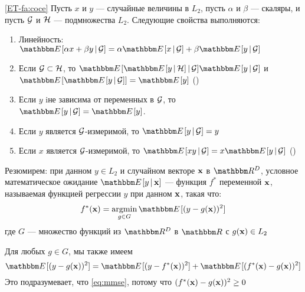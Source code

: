 \begin{frame}
    
    \vspace{2em}
    \Fact\eqref{ET-fa:coce}
    Пусть $x$ и $y$ --- случайные величины в $L_2$, пусть $\alpha$ и $\beta$ ---
    скаляры, и пусть $\mathcal G$ и $\mathcal H$ --- подмножества $L_2$. Следующие свойства выполняются:
    \begin{enumerate}
        \item Линейность: $\EE[ \alpha x + \beta y \given \gG] 
            = \alpha \EE[ x \given \gG ] + \beta \EE[ y \given \gG]$
        \item Если $\mathcal G \subset \mathcal H$, 
                то $\EE[ \EE[ y \given \hH] \given \gG] \EE[ y \given \gG]$ 
                и $\EE[ \EE[ y \given \gG] ] = \EE[y]$ ()
        \item Если $y$ iне зависима от переменных в $\mathcal G$, то $\EE[ y
            \given \gG] = \EE[y]$.
        \item Если $y$ является $\mathcal G$-измеримой, то $\EE[ y \given \gG] = y$
        \item Если $x$ является $\mathcal G$-измеримой, то $\EE[ x y \given \gG] = x \EE[y
            \given \gG]$ ()
    \end{enumerate}
    
\end{frame}

\begin{frame}

    \vspace{2em}
    Резюмирем: при данном $y \in L_2$ и случайном векторе ${\mathbf x}$ в $\RR^D$, условное математическое 
    ожидание $\EE[y \given \boldx]$ --- функция $f^*$ переменной
    ${\mathbf x}$, называемая функцией регрессии $y$ при данном ${\mathbf x}$,
    такая что:
    \begin{equation}
        \label{eq:mmse}
        f^*(\boldx) = \argmin_{g \in G} \EE[ (y - g(\boldx))^2 ] 
    \end{equation}
    где $G$ --- множество функций из $\RR^D$ в $\RR$ с $g({\mathbf x}) \in L_2$
    
    \vspace{1em}
    Для любых $g \in G$, мы также имеем
    \begin{equation}
        \label{eq:ebrf}
        \EE [ (y - g(\boldx))^2 ]
        = \EE [ (y - f^*(\boldx) )^2 ] +  \EE[ (f^*(\boldx) - g(\boldx))^2 ]
    \end{equation}
    Это подразумевает, что \eqref{eq:mmse}, потому что $(f^*({\mathbf x}) - g({\mathbf x}))^2 \geq 0$
    
\end{frame}

